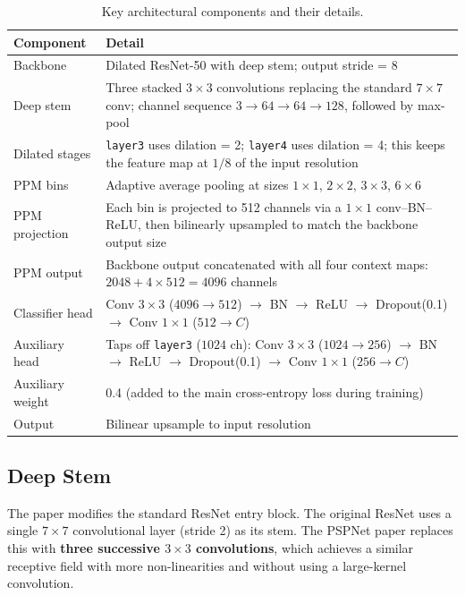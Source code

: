 \documentclass[12pt,a4paper]{article}
\newcommand{\code}[1]{\texttt{#1}}
\begin{document}
\begin{table}[H]
\centering
\caption{Key architectural components and their details.}
\label{tab:arch}
\begin{tabularx}{\linewidth}{lX}
\toprule
\textbf{Component} & \textbf{Detail} \\
\midrule
Backbone & Dilated ResNet-50 with deep stem; output stride = 8 \\
Deep stem & Three stacked $3\times3$ convolutions replacing the standard $7\times7$ conv; channel sequence $3\to64\to64\to128$, followed by max-pool \\
Dilated stages & \code{layer3} uses dilation = 2; \code{layer4} uses dilation = 4; this keeps the feature map at $1/8$ of the input resolution \\
PPM bins & Adaptive average pooling at sizes $1\times1$, $2\times2$, $3\times3$, $6\times6$ \\
PPM projection & Each bin is projected to 512 channels via a $1\times1$ conv--BN--ReLU, then bilinearly upsampled to match the backbone output size \\
PPM output & Backbone output concatenated with all four context maps: $2048 + 4 \times 512 = 4096$ channels \\
Classifier head & Conv $3\times3$ ($4096\to512$) $\to$ BN $\to$ ReLU $\to$ Dropout(0.1) $\to$ Conv $1\times1$ ($512\to C$) \\
Auxiliary head & Taps off \code{layer3} ($1024$ ch): Conv $3\times3$ ($1024\to256$) $\to$ BN $\to$ ReLU $\to$ Dropout(0.1) $\to$ Conv $1\times1$ ($256\to C$) \\
Auxiliary weight & 0.4 (added to the main cross-entropy loss during training) \\
Output & Bilinear upsample to input resolution \\
\bottomrule
\end{tabularx}
\end{table}

\subsection{Deep Stem}

The paper modifies the standard ResNet entry block.  The original ResNet uses
a single $7\times7$ convolutional layer (stride 2) as its stem.  The PSPNet
paper replaces this with \textbf{three successive $3\times3$ convolutions},
which achieves a similar receptive field with more non-linearities and without
using a large-kernel convolution.
\end{document}

